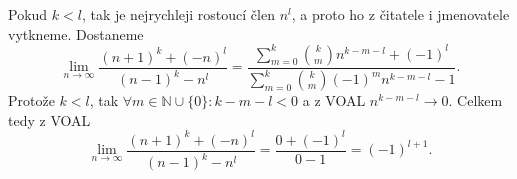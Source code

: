 \begin{enumerate}
{			Pokud $k<l$, tak je nejrychleji rostoucí člen $n^{l}$, a proto ho z čitatele i jmenovatele vytkneme. Dostaneme
			$$\lim_{n\rightarrow\infty} \frac{(n+1)^k+(-n)^l}{(n-1)^k-n^l}
				= \frac{\sum_{m=0}^{k}\binom{k}{m}n^{k-m-l}+(-1)^{l}}{\sum_{m=0}^{k}\binom{k}{m}(-1)^{m}n^{k-m-l}-1}.$$
			Protože $k<l$, tak  $\forall m\in\mathbb{N}\cup\{0\} :k-m-l<0$ a z VOAL $n^{k-m-l}\rightarrow0$.
			Celkem tedy z VOAL
			$$\lim_{n\rightarrow\infty} \frac{(n+1)^k+(-n)^l}{(n-1)^k-n^l}= \frac{0+(-1)^{l}}{0-1}=(-1)^{l+1}.$$
		}

\end{enumerate}

